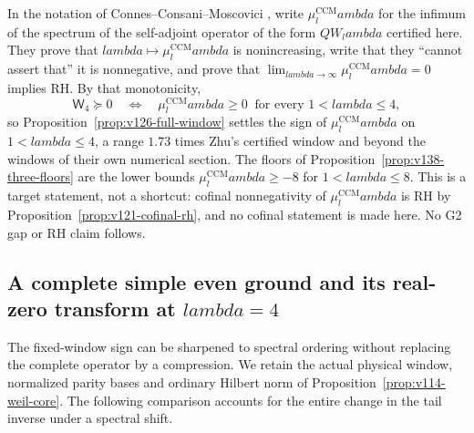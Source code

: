 \documentclass[11pt]{article}
\def\lambda{lambda}%
\theoremstyle{remark}
\begin{document}
In the notation of Connes--Consani--Moscovici
\cite[Corollaries~3.7--3.8]{ConnesConsaniMoscovici2025}, write
$\mu^{\mathrm{CCM}}_\lambda$ for the infimum of the spectrum of the
self-adjoint operator of the form $QW_\lambda$ certified here. They
prove that $\lambda\mapsto\mu^{\mathrm{CCM}}_\lambda$ is nonincreasing,
write that they ``cannot assert that'' it is nonnegative, and prove
that $\lim_{\lambda\to\infty}\mu^{\mathrm{CCM}}_\lambda=0$ implies RH.
By that monotonicity,
\[
 \mathsf W_4\succeq0
 \quad\Longleftrightarrow\quad
 \mu^{\mathrm{CCM}}_\lambda\ge0\ \text{ for every }1<\lambda\le4,
\]
so Proposition~\ref{prop:v126-full-window} settles the sign of
$\mu^{\mathrm{CCM}}_\lambda$ on $1<\lambda\le4$, a range $1.73$ times
Zhu's certified window and beyond the windows of their own numerical
section. The floors of Proposition~\ref{prop:v138-three-floors} are the
lower bounds $\mu^{\mathrm{CCM}}_\lambda\ge-8$ for $1<\lambda\le8$.
This is a target statement, not a shortcut: cofinal nonnegativity of
$\mu^{\mathrm{CCM}}_\lambda$ is RH by
Proposition~\ref{prop:v121-cofinal-rh}, and no cofinal statement is
made here. No G2 gap or RH claim follows.




\subsection{A complete simple even ground and its real-zero transform at \texorpdfstring{$\lambda=4$}{lambda=4}}

The fixed-window sign can be sharpened to spectral ordering without
replacing the complete operator by a compression. We retain the actual
physical window, normalized parity bases and ordinary Hilbert norm of
Proposition~\ref{prop:v114-weil-core}. The following comparison accounts
for the entire change in the tail inverse under a spectral shift.
\end{document}
